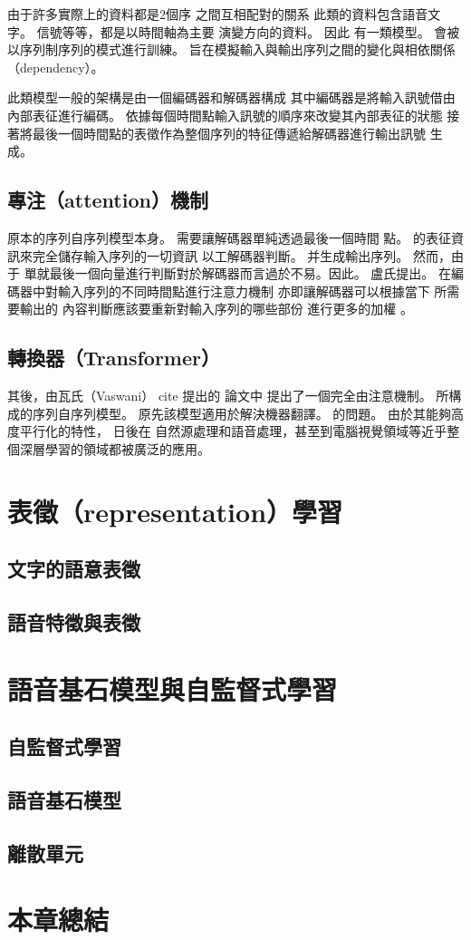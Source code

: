     由于許多實際上的資料都是2個序 之間互相配對的關系 此類的資料包含語音文字。 信號等等，都是以時間軸為主要 演變方向的資料。 因此 有一類模型。 會被以序列制序列的模式進行訓練。 旨在模擬輸入與輸出序列之間的變化與相依關係（dependency）。

此類模型一般的架構是由一個編碼器和解碼器構成 其中編碼器是將輸入訊號借由內部表征進行編碼。 依據每個時間點輸入訊號的順序來改變其內部表征的狀態 接著將最後一個時間點的表徵作為整個序列的特征傳遞給解碼器進行輸出訊號 生成。 
    
\subsection{專注（attention）機制}
    
    原本的序列自序列模型本身。 需要讓解碼器單純透過最後一個時間 點。 的表征資訊來完全儲存輸入序列的一切資訊 以工解碼器判斷。 并生成輸出序列。 然而，由于 單就最後一個向量進行判斷對於解碼器而言過於不易。因此。 盧氏提出。 在編碼器中對輸入序列的不同時間點進行注意力機制 亦即讓解碼器可以根據當下 所需要輸出的 內容判斷應該要重新對輸入序列的哪些部份 進行更多的加權 。

    

\subsection{轉換器（Transformer）}

其後，由瓦氏（Vaswani） cite 提出的 論文中 提出了一個完全由注意機制。 所構成的序列自序列模型。 原先該模型適用於解決機器翻譯。 的問題。
由於其能夠高度平行化的特性， 日後在 自然源處理和語音處理，甚至到電腦視覺領域等近乎整個深層學習的領域都被廣泛的應用。  


\section{表徵（representation）學習}

\subsection{文字的語意表徵}



\subsection{語音特徵與表徵}


\section{語音基石模型與自監督式學習}

\subsection{自監督式學習}

\subsection{語音基石模型}

\subsection{離散單元}


\section{本章總結}


